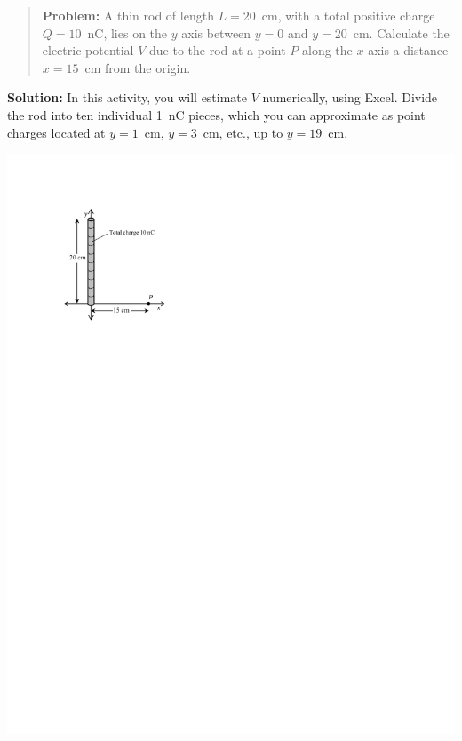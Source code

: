 \begin{minipage}{0.64\textwidth}
\begin{quote}
\textbf{Problem:} A thin rod of length $L=20$~cm, with a total positive charge $Q=10$~nC, lies on the $y$ axis between $y=0$ and $y=20$~cm.  Calculate the electric potential $V$ due to the rod at a point $P$ along the $x$ axis a distance $x=15$~cm from the origin. 
\end{quote}

\textbf{Solution:} In this activity, you will estimate $V$ numerically, using Excel.  Divide the rod into ten individual 1~nC pieces, which you can approximate as point charges located at $y=1$~cm, $y=3$~cm, etc., up to $y=19$~cm.  
\end{minipage}
\begin{minipage}{0.35\textwidth}
\vspace{-0.3in}
\raggedleft \includegraphics[scale=0.9]{potential_charge_distributions/rod_axes.pdf}
\end{minipage}

